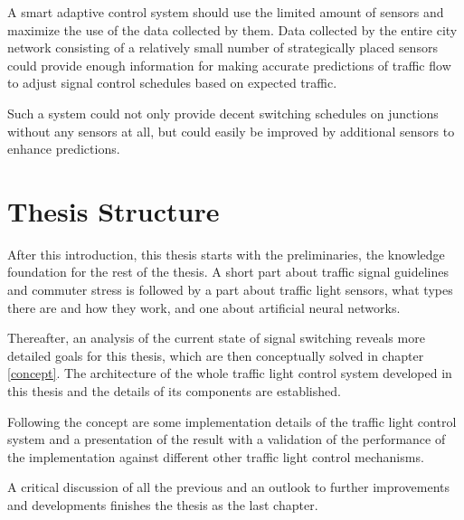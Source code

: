 A smart adaptive control system should use the limited amount of sensors and maximize the use of the data collected by them. Data collected by the entire city network consisting of a relatively small number of strategically placed sensors could provide enough information for making accurate predictions of traffic flow to adjust signal control schedules based on expected traffic.

Such a system could not only provide decent switching schedules on junctions without any sensors at all, but could easily be improved by additional sensors to enhance predictions.

\newpage

\section{Thesis Structure}

After this introduction, this thesis starts with the preliminaries, the knowledge foundation for the rest of the thesis. A short part about traffic signal guidelines and commuter stress is followed by a part about traffic light sensors, what types there are and how they work, and one about artificial neural networks.

Thereafter, an analysis of the current state of signal switching reveals more detailed goals for this thesis, which are then conceptually solved in chapter \ref{concept}. The architecture of the whole traffic light control system developed in this thesis and the details of its components are established.

Following the concept are some implementation details of the traffic light control system and a presentation of the result with a validation of the performance of the implementation against different other traffic light control mechanisms.

A critical discussion of all the previous and an outlook to further improvements and developments finishes the thesis as the last chapter.